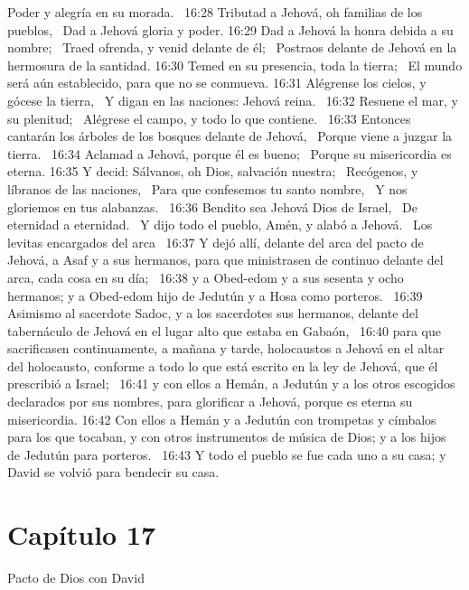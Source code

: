 Poder y alegría en su morada.  
16:28 Tributad a Jehová, oh familias de los pueblos,  
Dad a Jehová gloria y poder. 
16:29 Dad a Jehová la honra debida a su nombre;  
Traed ofrenda, y venid delante de él;  
Postraos delante de Jehová en la hermosura de la santidad. 
16:30 Temed en su presencia, toda la tierra;  
El mundo será aún establecido, para que no se conmueva. 
16:31 Alégrense los cielos, y gócese la tierra,  
Y digan en las naciones: Jehová reina.  
16:32 Resuene el mar, y su plenitud;  
Alégrese el campo, y todo lo que contiene.  
16:33 Entonces cantarán los árboles de los bosques delante de Jehová,  
Porque viene a juzgar la tierra.  
16:34 Aclamad a Jehová, porque él es bueno;  
Porque su misericordia es eterna. 
16:35 Y decid: Sálvanos, oh Dios, salvación nuestra;  
Recógenos, y líbranos de las naciones,  
Para que confesemos tu santo nombre,  
Y nos gloriemos en tus alabanzas.  
16:36 Bendito sea Jehová Dios de Israel,  
De eternidad a eternidad.  
Y dijo todo el pueblo, Amén, y alabó a Jehová.  
Los levitas encargados del arca  
16:37 Y dejó allí, delante del arca del pacto de Jehová, a Asaf y a sus hermanos, para que ministrasen de continuo delante del arca, cada cosa en su día;  
16:38 y a Obed-edom y a sus sesenta y ocho hermanos; y a Obed-edom hijo de Jedutún y a Hosa como porteros.  
16:39 Asimismo al sacerdote Sadoc, y a los sacerdotes sus hermanos, delante del tabernáculo de Jehová en el lugar alto que estaba en Gabaón,  
16:40 para que sacrificasen continuamente, a mañana y tarde, holocaustos a Jehová en el altar del holocausto, conforme a todo lo que está escrito en la ley de Jehová, que él prescribió a Israel;  
16:41 y con ellos a Hemán, a Jedutún y a los otros escogidos declarados por sus nombres, para glorificar a Jehová, porque es eterna su misericordia. 
16:42 Con ellos a Hemán y a Jedutún con trompetas y címbalos para los que tocaban, y con otros instrumentos de música de Dios; y a los hijos de Jedutún para porteros.  
16:43 Y todo el pueblo se fue cada uno a su casa; y David se volvió para bendecir su casa. 
\section*{Capítulo 17 }
Pacto de Dios con David   

